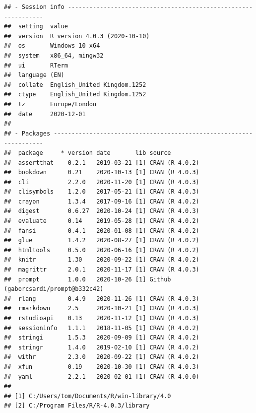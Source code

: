 \documentclass[
  10pt,
]{book}
\begin{document}
\begin{verbatim}
## - Session info ---------------------------------------------------------------
##  setting  value                       
##  version  R version 4.0.3 (2020-10-10)
##  os       Windows 10 x64              
##  system   x86_64, mingw32             
##  ui       RTerm                       
##  language (EN)                        
##  collate  English_United Kingdom.1252 
##  ctype    English_United Kingdom.1252 
##  tz       Europe/London               
##  date     2020-12-01                  
## 
## - Packages -------------------------------------------------------------------
##  package     * version date       lib source                             
##  assertthat    0.2.1   2019-03-21 [1] CRAN (R 4.0.2)                     
##  bookdown      0.21    2020-10-13 [1] CRAN (R 4.0.3)                     
##  cli           2.2.0   2020-11-20 [1] CRAN (R 4.0.3)                     
##  clisymbols    1.2.0   2017-05-21 [1] CRAN (R 4.0.3)                     
##  crayon        1.3.4   2017-09-16 [1] CRAN (R 4.0.2)                     
##  digest        0.6.27  2020-10-24 [1] CRAN (R 4.0.3)                     
##  evaluate      0.14    2019-05-28 [1] CRAN (R 4.0.2)                     
##  fansi         0.4.1   2020-01-08 [1] CRAN (R 4.0.2)                     
##  glue          1.4.2   2020-08-27 [1] CRAN (R 4.0.2)                     
##  htmltools     0.5.0   2020-06-16 [1] CRAN (R 4.0.2)                     
##  knitr         1.30    2020-09-22 [1] CRAN (R 4.0.2)                     
##  magrittr      2.0.1   2020-11-17 [1] CRAN (R 4.0.3)                     
##  prompt        1.0.0   2020-10-26 [1] Github (gaborcsardi/prompt@b332c42)
##  rlang         0.4.9   2020-11-26 [1] CRAN (R 4.0.3)                     
##  rmarkdown     2.5     2020-10-21 [1] CRAN (R 4.0.3)                     
##  rstudioapi    0.13    2020-11-12 [1] CRAN (R 4.0.3)                     
##  sessioninfo   1.1.1   2018-11-05 [1] CRAN (R 4.0.2)                     
##  stringi       1.5.3   2020-09-09 [1] CRAN (R 4.0.2)                     
##  stringr       1.4.0   2019-02-10 [1] CRAN (R 4.0.2)                     
##  withr         2.3.0   2020-09-22 [1] CRAN (R 4.0.2)                     
##  xfun          0.19    2020-10-30 [1] CRAN (R 4.0.3)                     
##  yaml          2.2.1   2020-02-01 [1] CRAN (R 4.0.0)                     
## 
## [1] C:/Users/tom/Documents/R/win-library/4.0
## [2] C:/Program Files/R/R-4.0.3/library
\end{verbatim}
\end{document}
